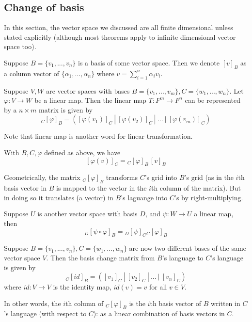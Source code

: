 \documentclass[11pt]{article}
\begin{document}
\subsection{Change of basis}
In this section, the vector space we discussed are all finite dimensional unless stated explicitly (although most theorems apply to infinite dimensional vector space too).

\begin{notation}
  Suppose \(B=\{v_1,...,v_n\}\) is a basis of some vector space. Then we denote \([v]_B\) as a column vector of \(\{\alpha_1,...,\alpha_n\}\) where \(v=\sum_{i=1}^{n}\alpha_iv_i\).
\end{notation}


\begin{definition}
  Suppose \(V,W\) are vector spaces with bases \(B=\{v_1,...,v_m\},C=\{w_1,...,w_n\}\). Let \(\varphi:V\to W\) be a linear map. Then the linear map \(T:F^m\to F^n\) can be represented by a \(n\times m\) matrix is given by
  \[{}_C[\varphi]_B = ([\varphi(v_1)]_C\:|\:[\varphi(v_2)]_C\:|\:...\:|\:[\varphi(v_m)]_C)\]
\end{definition}
Note that linear map is another word for linear transformation.

\begin{theorem}
  With \(B,C,\varphi\) defined as above, we have 
  \[[\varphi(v)]_C={}_C[\varphi]_B\,[v]_B\]
\end{theorem}

\begin{remark}
  Geometrically, the matrix \({}_C[\varphi]_B\) transforms \(C\)'s grid into \(B\)'s grid (as in the \(i\)th basis vector in \(B\) is mapped to the vector in the \(i\)th column of the matrix). But in doing so it translates (a vector) in \(B\)'s laguange into \(C\)'s by right-multiplying.
\end{remark}

\begin{theorem}
  Suppose \(U\) is another vector space with basis \(D\), and \(\psi:W\to U\) a linear map, then
  \[{}_D[\psi \circ \varphi]_B = {}_D[\psi]_C{}_C[\varphi]_B\]
\end{theorem}

\begin{definition}
  Suppose \(B=\{v_1,...,v_n\},C=\{w_1,...,w_n\}\) are now two different bases of the same vector space \(V\). Then the basis change matrix from \(B\)'s language to \(C\)'s language is given by
  \[{}_C[id]_B=([v_1]_C\:|\:[v_2]_C\:|\:...\:|\:[v_n]_C)\]
  where \(id:V\to V\) is the identity map, \(id(v)=v\) for all \(v\in V\). 
\end{definition}
In other words, the \(i\)th column of \({}_C[\varphi]_B\) is the \(i\)th basis vector of \(B\) written in \(C\)'s language (with respect to \(C\)): as a linear combination of basis vectors in \(C\).
\end{document}
